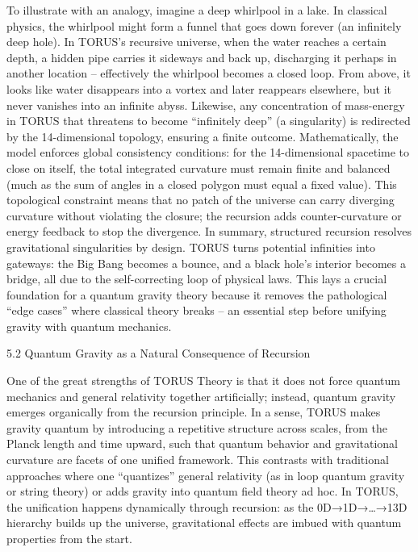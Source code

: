 \documentclass[]{article}
\begin{document}
To illustrate with an analogy, imagine a deep whirlpool in a lake. In
classical physics, the whirlpool might form a funnel that goes down
forever (an infinitely deep hole). In TORUS's recursive universe, when
the water reaches a certain depth, a hidden pipe carries it sideways and
back up, discharging it perhaps in another location -- effectively the
whirlpool becomes a closed loop. From above, it looks like water
disappears into a vortex and later reappears elsewhere, but it never
vanishes into an infinite abyss. Likewise, any concentration of
mass-energy in TORUS that threatens to become ``infinitely deep'' (a
singularity) is redirected by the 14-dimensional topology, ensuring a
finite outcome. Mathematically, the model enforces global consistency
conditions: for the 14-dimensional spacetime to close on itself, the
total integrated curvature must remain finite and balanced (much as the
sum of angles in a closed polygon must equal a fixed value). This
topological constraint means that no patch of the universe can carry
diverging curvature without violating the closure; the recursion adds
counter-curvature or energy feedback to stop the divergence. In summary,
structured recursion resolves gravitational singularities by design.
TORUS turns potential infinities into gateways: the Big Bang becomes a
bounce, and a black hole's interior becomes a bridge, all due to the
self-correcting loop of physical laws. This lays a crucial foundation
for a quantum gravity theory because it removes the pathological ``edge
cases'' where classical theory breaks -- an essential step before
unifying gravity with quantum mechanics.

5.2 Quantum Gravity as a Natural Consequence of Recursion

One of the great strengths of TORUS Theory is that it does not force
quantum mechanics and general relativity together artificially; instead,
quantum gravity emerges organically from the recursion principle. In a
sense, TORUS makes gravity quantum by introducing a repetitive structure
across scales, from the Planck length and time upward, such that quantum
behavior and gravitational curvature are facets of one unified
framework. This contrasts with traditional approaches where one
``quantizes'' general relativity (as in loop quantum gravity or string
theory) or adds gravity into quantum field theory ad hoc. In TORUS, the
unification happens dynamically through recursion: as the
0D→1D→\ldots{}→13D hierarchy builds up the universe, gravitational
effects are imbued with quantum properties from the start.
\end{document}
